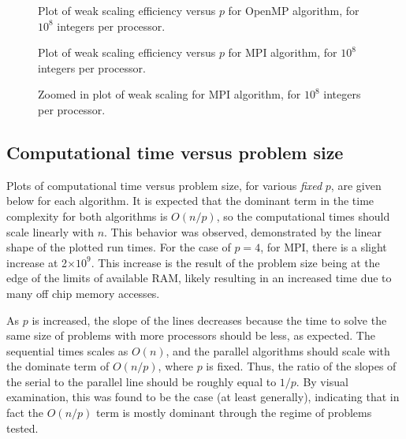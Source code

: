 \documentclass[12pt]{article}
\begin{document}
\begin{algorithm}
{{{{     \begin{figure}[htbp!]
         \centering
           \caption{Plot of weak scaling efficiency versus $p$ for OpenMP algorithm,
               for $10^8$ integers per processor.\label{ompw}}
     \end{figure}
\begin{figure}[htbp!]
           \centering
           \caption{Plot of weak scaling efficiency versus $p$ for MPI algorithm, for $10^8$ integers
               per processor.\label{mpiw}}
     \end{figure}
\begin{figure}[htbp!]
           \centering
           \caption{Zoomed in plot of weak scaling for MPI
           algorithm, for $10^8$ integers per processor.\label{mpizoomw}}
     \end{figure}
\clearpage
\subsection{Computational time versus problem size}

Plots of computational time versus problem size, for various \emph{fixed} $p$, are
given below for each algorithm.  It is expected that the dominant term in the
time complexity for both algorithms is $O(n/p)$, so the computational times should scale linearly with $n$.
This behavior was observed, demonstrated by the linear shape of the plotted run times.
For the case of $p=4$, for MPI, there is a slight
increase at 2$\times 10^9$. This increase is the result of the problem size being at the edge of the limits
of available RAM, likely resulting in an increased time due to many off chip memory
accesses.   

As $p$ is increased, the slope of the lines decreases because the time to solve the
same size of problems with more processors should be less, as expected.
The sequential times scales as $O(n)$, and the parallel algorithms should scale with
the dominate term of $O(n/p)$, where $p$ is fixed.  Thus, the ratio of the slopes of the
serial to the parallel line should be roughly equal to $1/p$.  By visual examination, this was found to be the
case (at least generally), indicating that in fact the $O(n/p)$ term is mostly
dominant through the regime of problems tested. 

}}}}
\end{algorithm}
\end{document}
